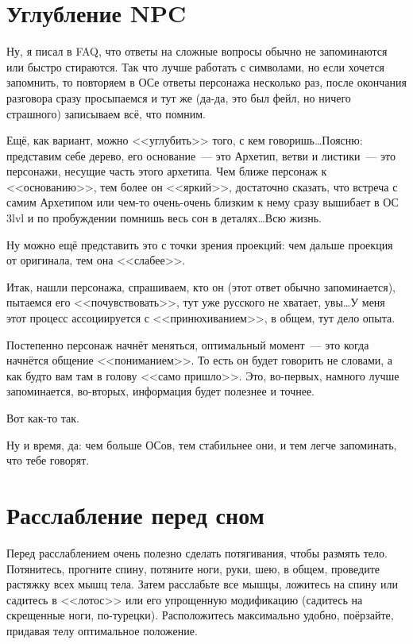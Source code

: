 \documentclass[a5paper,12pt,twoside]{memoir}
\begin{document}
\chapter{Углубление NPC}


Ну, я писал в FAQ, что ответы на сложные вопросы обычно не запоминаются или быстро стираются. Так что лучше работать с символами, но если хочется запомнить, то повторяем в ОСе ответы персонажа несколько раз, после окончания разговора сразу просыпаемся и тут же (да-да, это был фейл, но ничего страшного) записываем всё, что помним.
 
Ещё, как вариант, можно <<углубить>> того, с кем говоришь\ldots Поясню: представим себе дерево, его основание~--- это Архетип, ветви и листики~--- это персонажи, несущие часть этого архетипа. Чем ближе персонаж к <<основанию>>, тем более он <<яркий>>, достаточно сказать, что встреча с самим Архетипом или чем-то очень-очень близким к нему сразу вышибает в ОС 3lvl и по пробуждении помнишь весь сон в деталях\ldots Всю жизнь.
 
Ну можно ещё представить это с точки зрения проекций: чем дальше проекция от оригинала, тем она <<слабее>>. 

Итак, нашли персонажа, спрашиваем, кто он (этот ответ обычно запоминается), пытаемся его <<почувствовать>>, тут уже русского не хватает, увы\ldots У меня этот процесс ассоциируется с <<принюхиванием>>, в общем, тут дело опыта. 

Постепенно персонаж начнёт меняться, оптимальный момент~--- это когда начнётся общение <<пониманием>>. То есть он будет говорить не словами, а как будто вам там в голову <<само пришло>>. Это, во-первых, намного лучше запоминается, во-вторых, информация будет полезнее и точнее.
 
Вот как-то так.
 
Ну и время, да: чем больше ОСов, тем стабильнее они, и тем легче запоминать, что тебе говорят. 



\chapter{Расслабление перед сном}
Перед расслаблением очень полезно сделать потягивания, чтобы размять тело. Потянитесь, прогните спину, потяните ноги, руки, шею, в общем, проведите растяжку всех мышц тела. Затем расслабьте все мышцы, ложитесь на спину или садитесь в <<лотос>> или его упрощенную модификацию (садитесь на скрещенные ноги, по-турецки). Расположитесь максимально удобно, поёрзайте, придавая телу оптимальное положение.
\end{document}
